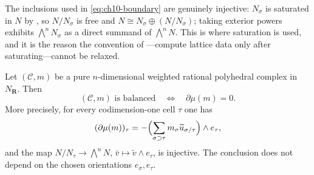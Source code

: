 The inclusions used in \eqref{eq:ch10-boundary} are genuinely injective:
$N_\sigma$ is saturated in $N$ by , so
$N/N_\sigma$ is free and $N\cong N_\sigma\oplus(N/N_\sigma)$; taking exterior
powers exhibits $\bigwedge^nN_\sigma$ as a direct summand of
$\bigwedge^nN$.  This is where saturation is used, and it is the reason the
convention of ---compute lattice data only after
saturating---cannot be relaxed.

\begin{theorem}
\label{thm:ch10-balancing-boundary}
Let $(\mathscr C,m)$ be a pure $n$-dimensional weighted rational polyhedral
complex in $N_{\mathbf R}$.  Then
\[
 (\mathscr C,m)\text{ is balanced}
 \quad\Longleftrightarrow\quad
 \partial\mu(m)=0 .
\]
More precisely, for every codimension-one cell $\tau$ one has
\begin{equation}
\label{eq:ch10-boundary-vs-balancing}
 (\partial\mu(m))_\tau
 =-\Bigl(\sum_{\sigma\supset\tau}m_\sigma\widetilde u_{\sigma/\tau}\Bigr)
   \wedge e_\tau,
\end{equation}
and the map $N/N_\tau\to\bigwedge^nN$, $\bar v\mapsto\widetilde v\wedge
e_\tau$, is injective.  The conclusion does not depend on the chosen
orientations $e_\sigma,e_\tau$.
\end{theorem}

